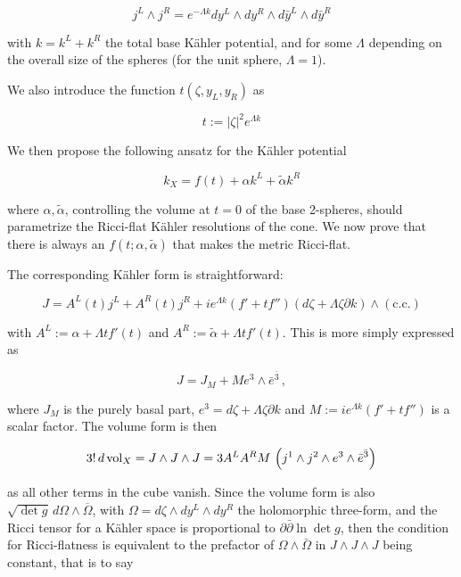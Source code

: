 \begin{equation}
	j^L \wedge j^R = e^{-\Lambda k} dy^L \wedge dy^R \wedge d\bar y^L \wedge d\bar y^R
\end{equation}

with $k = k^L + k^R$ the total base K\"ahler potential, and for some $\Lambda$ depending on the overall size of the spheres (for the unit sphere, $\Lambda = 1$).

We also introduce the function $t(\zeta,y_L,y_R)$ as 

\begin{equation}
	t := |\zeta|^2 e^{\Lambda k}
\end{equation}

We then propose the following ansatz for the K\"ahler potential

\begin{equation}
	k_X = f(t) + \alpha k^L + \tilde\alpha k^R
\end{equation}

where $\alpha,\tilde\alpha$, controlling the volume at $t=0$ of the base 2-spheres, should parametrize the Ricci-flat K\"ahler resolutions of the cone. We now prove that there is always an $f(t;\alpha,\tilde\alpha)$ that makes the metric Ricci-flat.

The corresponding K\"ahler form is straightforward:

\begin{equation}
	J = A^L(t) j^L + A^R(t) j^R + i e^{\Lambda k} (f' + t f'') (d\zeta + \Lambda \zeta \partial k) \wedge (\mathrm{c.c.})
\end{equation}

\newcommand{\fibral}{e^3 \wedge \bar e^{\bar 3}}

with $A^L := \alpha + \Lambda t f'(t)$ and  $A^R := \tilde\alpha + \Lambda t f'(t)$. This is more simply expressed as

\begin{equation}
J = J_M + M \fibral\,,
\end{equation}

where $J_M$ is the purely basal part, $e^3 = d\zeta + \Lambda \zeta \partial k$ and $M:= ie^{\Lambda k} \left( f' + t f'' \right)$ is a scalar factor. The volume form is then

\begin{equation}
	3!\, d\vol_X = J \wedge J \wedge J = 3 A^L A^R M \, \left( j^1 \wedge j^2 \wedge \fibral \right)
\end{equation}

as all other terms in the cube vanish. Since the volume form is also $\sqrt{\det g} \, d\Omega \wedge \overline \Omega$, with $\Omega = d\zeta \wedge dy^L \wedge dy^R$ the holomorphic three-form, and the Ricci tensor for a K\"ahler space is proportional to $\partial \bar \partial \ln \det g$, then the condition for Ricci-flatness is equivalent to the prefactor of $\Omega \wedge \bar \Omega$ in $J\wedge J \wedge J$ being constant, that is to say

